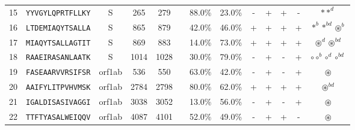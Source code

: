 \begin{tabular}{rcccccccccccc}
15 &  \texttt{YYVGYLQPRTFLLKY} &       S &    265 &   279 &                &                          88.0\% &                           23.0\% &          - &           + &          + &           - &                                                                                                         $ \ast \ast^d $ \\
16 &  \texttt{LTDEMIAQYTSALLA} &       S &    865 &   879 &                &                          42.0\% &                           46.0\% &          + &           + &          + &           + &                                                                                      $ \ast^b \ast^{bd} \circledast^b $ \\
17 &  \texttt{MIAQYTSALLAGTIT} &       S &    869 &   883 &                &                          14.0\% &                           73.0\% &          + &           + &          + &           + &                                                                                      $ \circledast^d \circledast^{bd} $ \\
18 &  \texttt{RAAEIRASANLAATK} &       S &   1014 &  1028 &                &                          30.0\% &                           79.0\% &          - &           + &          - &           + &                                                                                    $ \circ \circ^b \circ^d \circ^{bd} $ \\
19 &  \texttt{FASEAARVVRSIFSR} &  orf1ab &    536 &   550 &                &                          63.0\% &                           42.0\% &          - &           + &          - &           + &                                                                                                         $ \circledast $ \\
20 &  \texttt{AAIFYLITPVHVMSK} &  orf1ab &   2784 &  2798 &                &                          80.0\% &                           62.0\% &          + &           + &          + &           + &                                                                                                    $ \circledast^{bd} $ \\
21 &  \texttt{IGALDISASIVAGGI} &  orf1ab &   3038 &  3052 &                &                          13.0\% &                           56.0\% &          - &           + &          - &           + &                                                                                                         $ \circledast $ \\
22 &  \texttt{TTFTYASALWEIQQV} &  orf1ab &   4087 &  4101 &                &                          52.0\% &                           49.0\% &          - &           + &          + &           - &                                                                                                         $ \circledast $ \\

\end{tabular}
